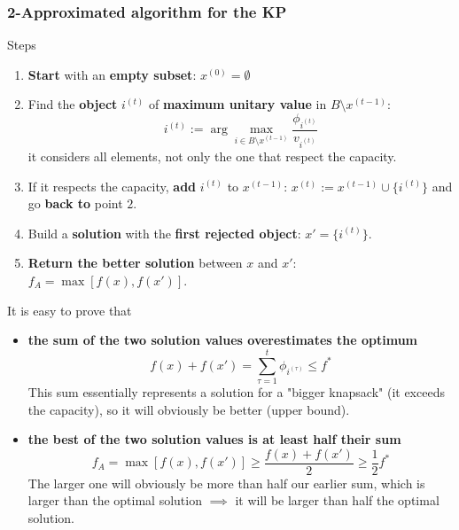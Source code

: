 \documentclass[11pt]{article}
\begin{document}
	\subsubsection{2-Approximated algorithm for the KP}
	Steps
	\begin{enumerate}
		\item \textbf{Start} with an \textbf{empty subset}: $x^{(0)} = \emptyset$
		
		\item Find the \textbf{object} $i^{(t)}$ of \textbf{maximum unitary value} in $B \setminus x^{(t−1)}$:
		$$ i^{(t)} := \arg \max_{i \in B \setminus x^{(t-1)}} \frac{\phi_{i^{(t)}}}{v_{i^{(t)}}}$$
		it considers all elements, not only the one that respect the capacity.\\
		
		\item If it respects the capacity, \textbf{add} $i^{(t)}$ to $x^{(t−1)}$: $x^{(t)} := x^{(t−1)} \cup \{i^{(t)}\}$ and go \textbf{back to} point $2$.\\
		
		\item Build a \textbf{solution} with the \textbf{first rejected object}: $x' = \{i^{(t)}\}$.\\
		
		\item \textbf{Return the better solution} between $x$ and $x'$: $f_A = \max \left[f (x), f (x')\right]$.\\
	\end{enumerate}
	
	
	It is easy to prove that
	\begin{itemize}
		\item \textbf{the sum of the two solution values overestimates the optimum}
		$$ f(x) + f(x') = \sum_{\tau = 1}^{t} \phi_{i^{(\tau)}} \leq f^\ast $$
		This sum essentially represents a solution for a "bigger knapsack" (it exceeds the capacity), so it will obviously be better (upper bound).\\
		
		\item \textbf{the best of the two solution values is at least half their sum}
		$$ f_A = \max \left[ f(x), f(x')\right] \geq \frac{f(x) + f(x')}{2} \geq \frac{1}{2} f^\ast$$
		The larger one will obviously be more than half our earlier sum, which is larger than the optimal solution $\implies$ it will be larger than half the optimal solution.\\
	\end{itemize}
	
\end{document}
